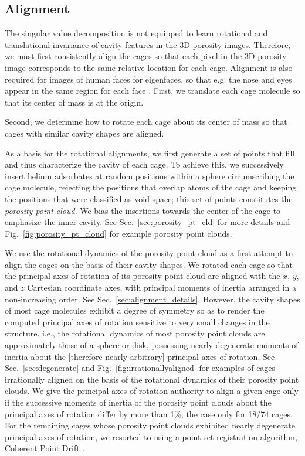 \documentclass[journal=jacsat,manuscript=article,layout=traditional]{achemso}
\begin{document}
\subsection{Alignment}
The singular value decomposition is not equipped to learn rotational and translational invariance of cavity features in the 3D porosity images. Therefore, we must first consistently align the cages so that each pixel in the 3D porosity image corresponds to the same relative location for each cage. 
Alignment is also required for images of human faces for eigenfaces, so that e.g. the nose and eyes appear in the same region for each face \cite{zhang2008eigenfaces}. First, we translate each cage molecule so that its center of mass is at the origin. {\color{red} Second, we determine how to rotate each cage about its center of mass so that cages with similar cavity shapes are aligned.

As a basis for the rotational alignments, we first generate a set of points that fill and thus characterize the cavity of each cage. To achieve this, we successively insert helium adsorbates at random positions within a sphere circumscribing the cage molecule, rejecting the positions that overlap atoms of the cage and keeping the positions that were classified as void space; this set of points constitutes the \emph{porosity point cloud}. We bias the insertions towards the center of the cage to emphasize the inner-cavity. See Sec.~\ref{sec:porosity_pt_cld} for more details and Fig.~\ref{fig:porosity_pt_cloud} for example porosity point clouds.

We use the rotational dynamics of the porosity point cloud as a first attempt to align the cages on the basis of their cavity shapes. We rotated each cage so that the principal axes of rotation of its porosity point cloud are aligned with the $x$, $y$, and $z$ Cartesian coordinate axes, with principal moments of inertia arranged in a non-increasing order. See Sec.~\ref{sec:alignment_details}. However, the cavity shapes of most cage molecules exhibit a degree of symmetry so as to render the computed principal axes of rotation sensitive to very small changes in the structure. i.e., the rotational dynamics of most porosity point clouds are approximately those of a sphere or disk, possessing nearly degenerate moments of inertia about the [therefore nearly arbitrary] principal axes of rotation. See Sec.~\ref{sec:degenerate} and Fig.~\ref{fig:irrationallyaligned} for examples of cages irrationally aligned on the basis of the rotational dynamics of their porosity point clouds.
We give the principal axes of rotation authority to align a given cage only if the successive moments of inertia of the porosity point clouds about the principal axes of rotation differ by more than 1\%, the case only for 18/74 cages. For the remaining cages whose porosity point clouds exhibited nearly degenerate principal axes of rotation, we resorted to using a point set registration algorithm, Coherent Point Drift \cite{myronenko2010point}.

}
\end{document}
